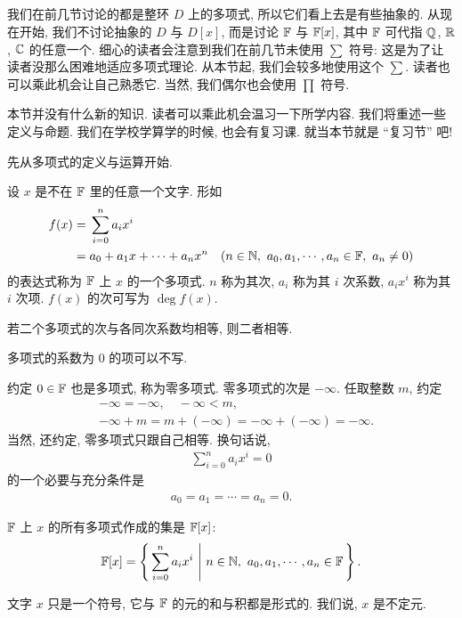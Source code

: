 \subsection*{\PolynomialsOverF}
\markright{\PolynomialsOverF}

我们在前几节讨论的都是整环 $D$ 上的多项式, 所以它们看上去是有些抽象的. 从现在开始, 我们不讨论抽象的 $D$ 与 $D[x]$, 而是讨论 $\mathbb{F}$ 与 $\mathbb{F}[x]$, 其中 $\mathbb{F}$ 可代指 $\mathbb{Q}$, $\mathbb{R}$, $\mathbb{C}$ 的任意一个. 细心的读者会注意到我们在前几节未使用 $\sum$ 符号: 这是为了让读者没那么困难地适应多项式理论. 从本节起, 我们会较多地使用这个 $\sum$. 读者也可以乘此机会让自己熟悉它. 当然, 我们偶尔也会使用 $\prod$ 符号.

本节并没有什么新的知识. 读者可以乘此机会温习一下所学内容. 我们将重述一些定义与命题. 我们在学校学算学的时候, 也会有复习课. 就当本节就是 ``复习节'' 吧!

先从多项式的定义与运算开始.

\begin{definition}
    设 $x$ 是不在 $\mathbb{F}$ 里的任意一个文字. 形如
    \begin{align*}
        f(x)
        = {} & \sum_{i=0}^n a_i x^i                                                                       \\
        = {} & a_0 + a_1 x + \cdots + a_n x^n \quad (n \in \NN,\ a_0,a_1,\cdots,a_n \in \FF,\ a_n \neq 0)
    \end{align*}
    的表达式称为 $\mathbb{F}$ 上 $x$ 的一个多项式. $n$ 称为其次, $a_i$ 称为其 $i$ 次系数, $a_i x^i$ 称为其 $i$ 次项. $f(x)$ 的次可写为 $\deg f(x)$.

    若二个多项式的次与各同次系数均相等, 则二者相等.

    多项式的系数为 $0$ 的项可以不写.

    约定 $0 \in \mathbb{F}$ 也是多项式, 称为零多项式. 零多项式的次是 $-\infty$. 任取整数 $m$, 约定
    \begin{align*}
         & -\infty = -\infty, \quad -\infty < m,                        \\
         & -\infty + m = m + (-\infty) = -\infty + (-\infty) = -\infty.
    \end{align*}
    当然, 还约定, 零多项式只跟自己相等. 换句话说,
    \begin{align*}
        \sum_{i=0}^n a_i x^i = 0
    \end{align*}
    的一个必要与充分条件是
    \begin{align*}
        a_0 = a_1 = \cdots = a_n = 0.
    \end{align*}

    $\mathbb{F}$ 上 $x$ 的所有多项式作成的集是 $\mathbb{F}[x]$:
    \begin{align*}
        \mathbb{F}[x] = \left\{\, \sum_{i=0}^n a_i x^i \,\,\middle|\,\, n \in \mathbb{N},\ a_0,a_1,\cdots,a_n \in \mathbb{F} \,\right\}.
    \end{align*}

    文字 $x$ 只是一个符号, 它与 $\mathbb{F}$ 的元的和与积都是形式的. 我们说, $x$ 是不定元.
\end{definition}

